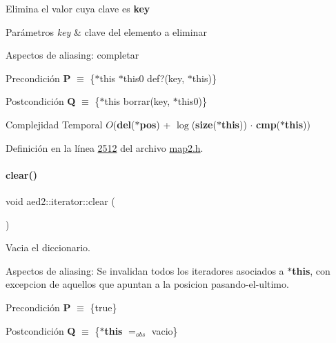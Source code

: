 Elimina el valor cuya clave es {\bfseries key} 


\begin{DoxyParams}{Parámetros}
{\em key} & clave del elemento a eliminar\\
\hline
\end{DoxyParams}
\begin{DoxyParagraph}{Aspectos de aliasing\+:}
completar
\end{DoxyParagraph}
\begin{DoxyPrecond}{Precondición}
{\bfseries P} $\equiv$ \{$\ast$this  $\ast$this0  def?(key, $\ast$this)\} 
\end{DoxyPrecond}
\begin{DoxyPostcond}{Postcondición}
{\bfseries Q} $\equiv$ \{$\ast$this  borrar(key, $\ast$this0)\}
\end{DoxyPostcond}

\begin{DoxyDescription}
\item[Complejidad Temporal]$O$({\bfseries del}({\bfseries $\ast$pos}) + $\log$({\bfseries size}({\bfseries $\ast$this})) $\cdot$ {\bfseries cmp}({\bfseries $\ast$this}))
\end{DoxyDescription}

Definición en la línea \hyperlink{map2_8h_source_l02512}{2512} del archivo \hyperlink{map2_8h_source}{map2.\+h}.

\mbox{\label{classaed2_1_1iterator_ac98b533e402839c99d33d3118906c38f_ac98b533e402839c99d33d3118906c38f}} 
\paragraph{\texorpdfstring{clear()}{clear()}}
{\footnotesize\ttfamily void aed2\+::iterator\+::clear (\begin{DoxyParamCaption}{ }\end{DoxyParamCaption})\hspace{0.3cm}{\ttfamily [inline]}}



Vacia el diccionario. 

\begin{DoxyParagraph}{Aspectos de aliasing\+:}
Se invalidan todos los iteradores asociados a {\bfseries $\ast$this}, con excepcion de aquellos que apuntan a la posicion pasando-\/el-\/ultimo.
\end{DoxyParagraph}
\begin{DoxyPrecond}{Precondición}
{\bfseries P} $\equiv$ \{true\} 
\end{DoxyPrecond}
\begin{DoxyPostcond}{Postcondición}
{\bfseries Q} $\equiv$ \{{\bfseries $\ast$this} $=_{obs}$ vacio\}
\end{DoxyPostcond}

